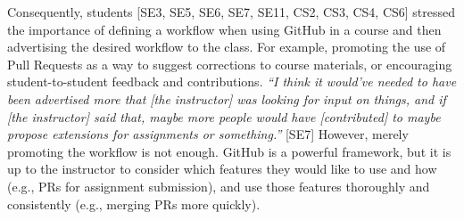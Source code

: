 
Consequently, students [SE3, SE5, SE6, SE7, SE11, CS2, CS3, CS4, CS6] stressed the importance of defining a workflow when using GitHub in a course and then advertising the desired workflow to the class. For example, promoting the use of Pull Requests as a way to suggest corrections to course materials, or encouraging student-to-student feedback and contributions. \textit{``I think it would've needed to have been advertised more that [the instructor] was looking for input on things, and if [the instructor] said that, maybe more people would have [contributed] to maybe propose extensions for assignments or something.''} [SE7] However, merely promoting the workflow is not enough. GitHub is a powerful framework, but it is up to the instructor to consider which features they would like to use and how (e.g., PRs for assignment submission), and use those features thoroughly and consistently (e.g., merging PRs more quickly).


